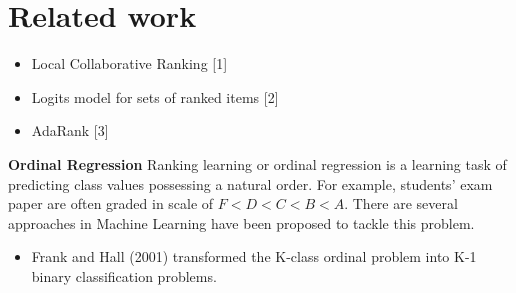 \section{Related work}
\label{sec:related}

	\begin{itemize}

	\item Local Collaborative Ranking [1]

	\item Logits model for sets of ranked items [2]

	\item AdaRank [3]
	\end{itemize}

\textbf{Ordinal Regression}
Ranking learning or ordinal regression is a learning task of predicting class values possessing a natural order. For example, students' exam paper are often graded in scale of $F < D < C < B < A$. There are several approaches in Machine Learning have been proposed to tackle this problem. 

	\begin{itemize}
		\item Frank and Hall (2001) transformed the K-class ordinal problem into K-1 binary classification problems.
	\end{itemize}

